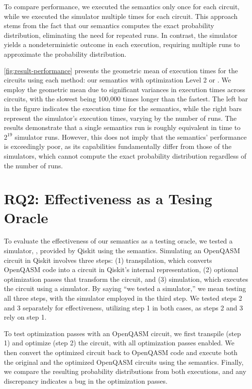 To compare performance, we executed the semantics only once for each circuit,
while we executed the simulator multiple times for each circuit.
%
This approach stems from the fact that our semantics computes the exact
probability distribution, eliminating the need for repeated runs.
%
In contrast, the simulator yields a nondeterministic outcome in each execution,
requiring multiple runs to approximate the probability distribution.

\cref{fig:result-performance} presents the geometric mean of execution times for
the circuits using each method: our semantics with optimization Level 2 or
.
%
We employ the geometric mean due to significant variances in execution times
across circuits, with the slowest being 100,000 times longer than the fastest.
%
The left bar in the figure indicates the execution time for the semantics,
while the right bars represent the simulator's execution times, varying by the
number of runs.
%
The results demonstrate that a single semantics run is roughly equivalent in
time to $2^{19}$ simulator runs.
%
However, this does not imply that the semantics' performance is exceedingly
poor, as its capabilities fundamentally differ from those of the simulators,
which cannot compute the exact probability distribution regardless of the
number of runs.

\section{RQ2: Effectiveness as a Tesing Oracle}
\label{ch:evaluation:rq2}

\noindent
To evaluate the effectiveness of our semantics as a testing oracle, we tested a
simulator, , provided by Qiskit using the semantics.
%
Simulating an OpenQASM circuit in Qiskit involves three steps:
%
(1) transpilation, which converts OpenQASM code into a circuit in Qiskit's
internal representation,
%
(2) optional optimization passes that transform the circuit, and
%
(3) simulation, which executes the circuit using a simulator.
%
By saying ``we tested a simulator,'' we mean testing all three steps, with the
simulator employed in the third step.
%
We tested steps 2 and 3 separately for effectiveness, utilizing step 1 in both
cases, as steps 2 and 3 rely on step 1.

To test optimization passes with an OpenQASM circuit, we first transpile (step
1) and optimize (step 2) the circuit, with all optimization passes enabled.
%
We then convert the optimized circuit back to OpenQASM code and execute both
the original and the optimized OpenQASM circuits using the semantics.
%
Finally, we compare the resulting probability distributions from both
executions, and any discrepancy indicates a bug in the optimization passes.

